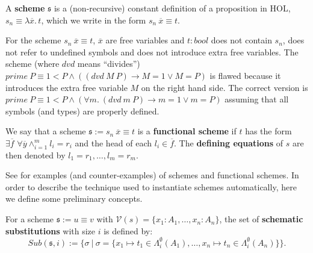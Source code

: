 
\begin{defn}[Schemes]
A {\bf scheme} $\mathfrak{s}$ is a (non-recursive) constant definition of a
proposition in HOL, $s_n \equiv  \lambda \overline{x}.\, t$, which we write in the form $s_n\ \overline{x} \equiv  t$.
\end{defn}

\noindent For the scheme $s_n\ \overline{x} \equiv  t$, $\overline{x}$ are free variables and $t : bool$ does not contain $s_n$, does not refer to undefined symbols and does not introduce extra free variables. The scheme (where $dvd$ means ``divides'') $prime\ P \equiv 1<P \land ((dvd\ M\ P) \rightarrow M=1 \lor M=P)$ is flawed because it introduces the extra free variable $M$ on the right hand side. The correct version is $prime\ P \equiv 1<P \land (\forall m.\ (dvd\ m\ P) \rightarrow m=1 \lor m=P)$ assuming that all symbols (and types) are properly defined.

\begin{defn}
We say that a scheme $\mathfrak{s} := s_n\ \overline{x} \equiv t$ is a {\bf functional scheme} if $t$ has the form $\exists \overline{f}\,\,\forall \overline{y} \land_{i=1}^m l_i = r_i$ and the head of each $l_i \in \overline{f}$. The {\bf defining equations} of $s$ are then denoted by $l_1 = r_1,\ldots,l_m = r_m$.
\end{defn}

See \cite{Montano-Rivas:micai2010,Montano-Rivas:eswa} for examples (and counter-examples) of schemes and functional schemes. In order to describe the technique used to instantiate schemes automatically, here we define some preliminary concepts.

\begin{defn}
\label{schematic-substitutions}
For a scheme $\mathfrak{s} := u \equiv v$ with $\mathcal{V}(s)=\{x_1 : A_1, \ldots, x_n : A_n\}$, the set of {\bf schematic substitutions} with size $i$ is defined by:
$$Sub(\mathfrak{s}, i) := \{ \sigma\ | \ \sigma = \{x_1 \mapsto t_1 \in\Lambda_i^{\emptyset}(A_1),\ldots,x_n \mapsto t_n \in\Lambda_i^{\emptyset}(A_n)\} \}.$$
\end{defn}

